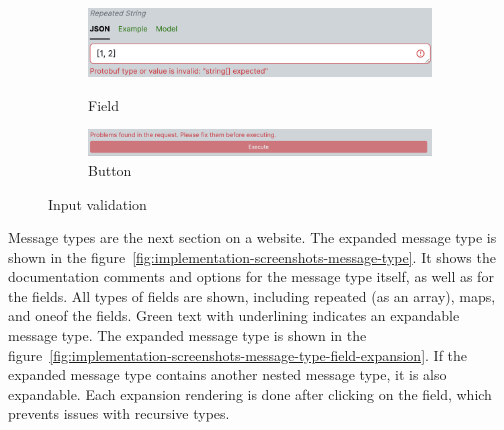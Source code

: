 \begin{figure}[!htb]
    \centering
    \captionsetup{justification=centering}

    \begin{subfigure}{1\textwidth}
        \centering
        \includegraphics[width=.8\linewidth]{images/implementation/screenshots/input-validation-error}
        \caption{Field}

        \centering
        \includegraphics[width=.8\linewidth]{images/implementation/screenshots/input-validation-error-button}
        \caption{Button}
    \end{subfigure}%

    \caption{Input validation}
    \label{fig:implementation-screenshots-inputs-validation}
\end{figure}


Message types are the next section on a website.
The expanded message type is shown in the figure~\ref{fig:implementation-screenshots-message-type}.
It shows the documentation comments and options for the message type itself, as well as for the fields.
All types of fields are shown, including repeated (as an array), maps, and oneof the fields.
Green text with underlining indicates an expandable message type.
The expanded message type is shown in the figure~\ref{fig:implementation-screenshots-message-type-field-expansion}.
If the expanded message type contains another nested message type, it is also expandable.
Each expansion rendering is done after clicking on the field, which prevents issues with recursive types.

